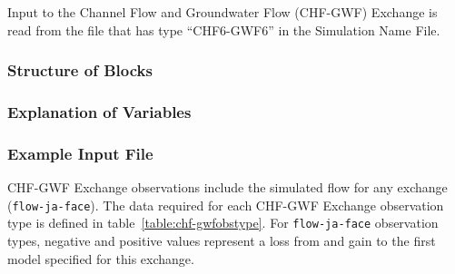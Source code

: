 Input to the Channel Flow and Groundwater Flow (CHF-GWF) Exchange is read from the file that has type ``CHF6-GWF6'' in the Simulation Name File.

\vspace{5mm}
\subsubsection{Structure of Blocks}




\vspace{5mm}
\subsubsection{Explanation of Variables}
\begin{description}

\end{description}

\vspace{5mm}
\subsubsection{Example Input File}


CHF-GWF Exchange observations include the simulated flow for any exchange (\texttt{flow-ja-face}). The data required for each CHF-GWF Exchange observation type is defined in table~\ref{table:chf-gwfobstype}. For \texttt{flow-ja-face} observation types, negative and positive values represent a loss from and gain to the first model specified for this exchange.




% 


% 

